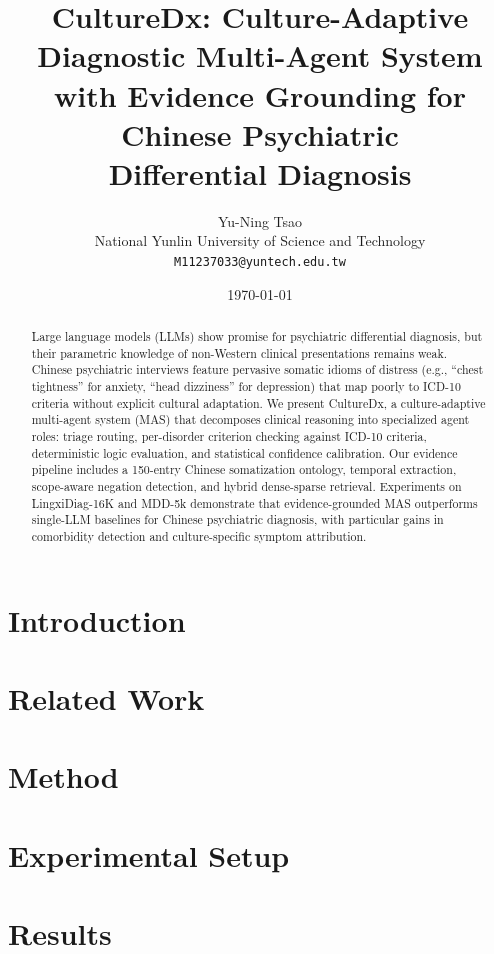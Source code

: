 \documentclass[11pt,a4paper]{article}
\title{CultureDx: Culture-Adaptive Diagnostic Multi-Agent System\\
       with Evidence Grounding for Chinese Psychiatric\\
       Differential Diagnosis}
\author{Yu-Ning Tsao \\
  National Yunlin University of Science and Technology \\
  \texttt{M11237033@yuntech.edu.tw}}
\date{\today}
\begin{document}
\maketitle

\begin{abstract}
Large language models (LLMs) show promise for psychiatric differential diagnosis, but their parametric knowledge of non-Western clinical presentations remains weak. Chinese psychiatric interviews feature pervasive somatic idioms of distress (e.g., ``chest tightness'' for anxiety, ``head dizziness'' for depression) that map poorly to ICD-10 criteria without explicit cultural adaptation. We present CultureDx, a culture-adaptive multi-agent system (MAS) that decomposes clinical reasoning into specialized agent roles: triage routing, per-disorder criterion checking against ICD-10 criteria, deterministic logic evaluation, and statistical confidence calibration. Our evidence pipeline includes a 150-entry Chinese somatization ontology, temporal extraction, scope-aware negation detection, and hybrid dense-sparse retrieval. Experiments on LingxiDiag-16K and MDD-5k demonstrate that evidence-grounded MAS outperforms single-LLM baselines for Chinese psychiatric diagnosis, with particular gains in comorbidity detection and culture-specific symptom attribution.
\end{abstract}

\section{Introduction}
\label{sec:introduction}


\section{Related Work}
\label{sec:related-work}


\section{Method}
\label{sec:method}


\section{Experimental Setup}
\label{sec:experiments}


\section{Results}
\label{sec:results}

\end{document}
